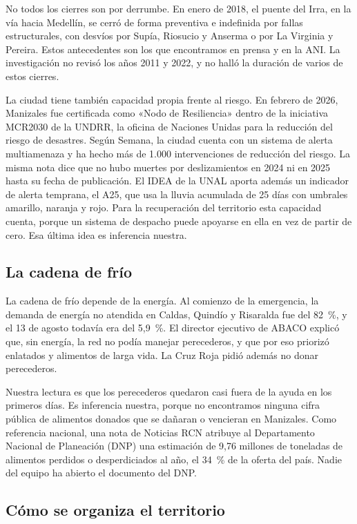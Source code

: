 No todos los cierres son por derrumbe. En enero de 2018, el puente del Irra, en la vía hacia Medellín, se cerró de forma preventiva e indefinida por fallas estructurales, con desvíos por Supía, Riosucio y Anserma o por La Virginia y Pereira. Estos antecedentes son los que encontramos en prensa y en la ANI. La investigación no revisó los años 2011 y 2022, y no halló la duración de varios de estos cierres.

La ciudad tiene también capacidad propia frente al riesgo. En febrero de 2026, Manizales fue certificada como «Nodo de Resiliencia» dentro de la iniciativa MCR2030 de la UNDRR, la oficina de Naciones Unidas para la reducción del riesgo de desastres. Según Semana, la ciudad cuenta con un sistema de alerta multiamenaza y ha hecho más de 1.000 intervenciones de reducción del riesgo. La misma nota dice que no hubo muertes por deslizamientos en 2024 ni en 2025 hasta su fecha de publicación. El IDEA de la UNAL aporta además un indicador de alerta temprana, el A25, que usa la lluvia acumulada de 25 días con umbrales amarillo, naranja y rojo. Para la recuperación del territorio esta capacidad cuenta, porque un sistema de despacho puede apoyarse en ella en vez de partir de cero. Esa última idea es inferencia nuestra.

\subsection{La cadena de frío}

La cadena de frío depende de la energía. Al comienzo de la emergencia, la demanda de energía no atendida en Caldas, Quindío y Risaralda fue del 82~\%, y el 13 de agosto todavía era del 5,9~\%. El director ejecutivo de ABACO explicó que, sin energía, la red no podía manejar perecederos, y que por eso priorizó enlatados y alimentos de larga vida. La Cruz Roja pidió además no donar perecederos.

Nuestra lectura es que los perecederos quedaron casi fuera de la ayuda en los primeros días. Es inferencia nuestra, porque no encontramos ninguna cifra pública de alimentos donados que se dañaran o vencieran en Manizales. Como referencia nacional, una nota de Noticias RCN atribuye al Departamento Nacional de Planeación (DNP) una estimación de 9,76 millones de toneladas de alimentos perdidos o desperdiciados al año, el 34~\% de la oferta del país. Nadie del equipo ha abierto el documento del DNP.

\subsection{Cómo se organiza el territorio}


